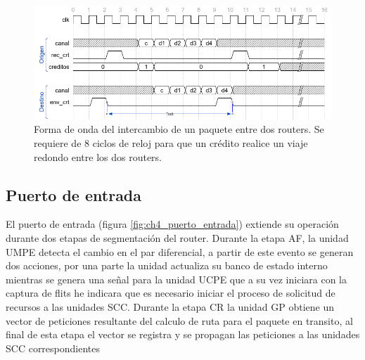 \begin{figure}
	\begin{center}
		\includegraphics[width=\linewidth]{figures/ch4_w_rtt.png}
	\end{center}
	\caption
		{	
			Forma de onda del intercambio de un paquete entre dos routers. Se requiere de 8 ciclos de reloj para que un crédito realice un viaje redondo entre los dos routers.
		}
	\label{fig:ch4_rtt}
\end{figure}










\subsection{Puerto de entrada}
	\label{puerto_entrada}

El puerto de entrada (figura \ref{fig:ch4_puerto_entrada}) extiende su operación durante dos etapas de segmentación del router. Durante la etapa AF, la unidad UMPE detecta el cambio en el par diferencial, a partir de este evento se generan dos acciones, por una parte la unidad actualiza su banco de estado interno mientras se genera una señal para la unidad UCPE que a su vez iniciara con la captura de flits he indicara que es necesario iniciar el proceso de solicitud de recursos a las unidades SCC. Durante la etapa CR la unidad GP obtiene un vector de peticiones resultante del calculo de ruta para el paquete en transito, al final de esta etapa el vector se registra y se propagan las peticiones a las unidades SCC correspondientes

